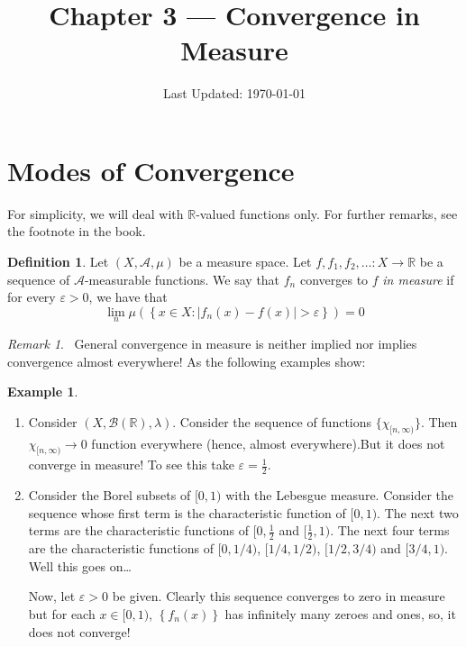 \documentclass[12pt]{article}
\title{Chapter 3 --- Convergence in Measure}
\author{}
\date{Last Updated: \today}
\theoremstyle{definition}
\newtheorem{definition}[theorem]{Definition}
\newtheorem{example}[theorem]{Example}
\theoremstyle{remark}
\newtheorem{remark}[theorem]{Remark}
\theoremstyle{plain}
\newcommand{\R}{\mathbb R}
\newcommand{\scrA}{{\mathscr A}}
\newcommand{\scrB}{{\mathscr B}}
\begin{document}
\maketitle
\tableofcontents

\section{Modes of Convergence}

For simplicity, we will deal with $\R$-valued functions only. For further remarks, see the footnote in the book.

\begin{definition}
    Let $\left( X, \scrA , \mu \right)$ be a measure space. Let $f, f_1 ,f_2 ,\ldots : X\to \R$ be a sequence of $\scrA$-measurable functions. We say that $f_n$ converges to $f$ \textit{in measure} if for every $\varepsilon > 0$, we have that
    \begin{equation*}
	\lim_n \mu \left( \left\{ x \in X : \Big| f_n \left( x \right) - f\left( x \right) \Big| > \varepsilon \right\} \right)=0
    \end{equation*}
\end{definition}

\begin{remark}
    \warning \,  General convergence in measure is neither implied nor implies convergence almost everywhere! As the following examples show:
\end{remark}

\begin{example}
    \label{ex:conM-conAE}
    \begin{enumerate}
	\item Consider $\left( X, \scrB (\R) , \lambda \right)$. Consider the sequence of functions $\{\chi _ {[n, \infty)}\}$. Then $\chi_{[n, \infty)} \to 0$ function everywhere (hence, almost everywhere).But it does not converge in measure! To see this take $\varepsilon = \frac{1}{2}$. 
	\item Consider the Borel subsets of $[0, 1)$ with the Lebesgue measure. Consider the sequence whose first term is the characteristic function of $[0,1)$. The next two terms are the characteristic functions of $[0,\frac{1}{2}$ and $[\frac{1}{2}, 1)$. The next four terms are the characteristic functions of $[0, 1/4)$, $[1/4,1/2)$, $[1/2, 3/4)$ and $[3/4, 1)$. Well this goes on\ldots

		Now, let $\varepsilon > 0$ be given. Clearly this sequence converges to zero in measure but for each $x\in [0,1)$, $\left\{ f_n (x) \right\}$ has infinitely many zeroes and ones, so, it does not converge!
    \end{enumerate}
\end{example}
\end{document}
